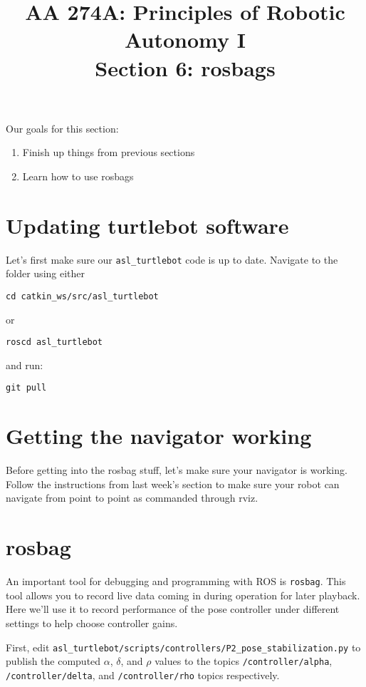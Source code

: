 \documentclass{article}
\title{AA 274A: Principles of Robotic Autonomy I \\Section 6: rosbags}
\date{}
\begin{document}
\maketitle
\pagestyle{fancy}
\vspace{-1.25cm}
Our goals for this section: 
\begin{enumerate}
    \item Finish up things from previous sections
    \item Learn how to use rosbags
\end{enumerate}

\section{Updating turtlebot software}
Let's first make sure our \verb|asl_turtlebot| code is up to date. Navigate to the folder using either 
\begin{verbatim}
cd catkin_ws/src/asl_turtlebot
\end{verbatim}
or 
\begin{verbatim}
roscd asl_turtlebot
\end{verbatim}
and run:
\begin{verbatim}
git pull
\end{verbatim}

\section{Getting the navigator working}
Before getting into the rosbag stuff, let's make sure your navigator is working. Follow the instructions from last week's section to make sure your robot can navigate from point to point as commanded through rviz.

\section{rosbag}
An important tool for debugging and programming with ROS is \texttt{rosbag}. This tool allows you to record live data coming in during operation for later playback. Here we'll use it to record performance of the pose controller under different settings to help choose controller gains.

First, edit \texttt{asl\_turtlebot/scripts/controllers/P2\_pose\_stabilization.py} to publish the computed $\alpha$, $\delta$, and $\rho$ values to the topics \texttt{/controller/alpha}, \texttt{/controller/delta}, and \texttt{/controller/rho} topics respectively. 
\end{document}
